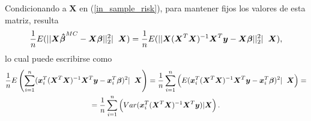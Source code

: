 \documentclass[a4paper,12pt]{report}
\begin{document}
Condicionando a $\boldsymbol{X}$ en (\ref{in_sample_risk}), para mantener fijos los valores de esta matriz, resulta
\begin{gather}
\label{eq: in_sample_risk a}
\frac{1}{n}E(||\boldsymbol{X}\boldsymbol{\hat{\beta}}^{MC}-\boldsymbol{X}\boldsymbol{\beta}||_2^2| \hspace{0.2cm} \boldsymbol{X}) =  
\frac{1}{n}E(||\boldsymbol{X}(\boldsymbol{X}^T\boldsymbol{X})^{-1}\boldsymbol{X}^T\boldsymbol{y}-\boldsymbol{X}\boldsymbol{\beta}||_2^2| \hspace{0.2cm} \boldsymbol{X}),
\end{gather}
lo cual puede escribirse como
\begin{gather}
\nonumber
\frac{1}{n}E\left(\sum_{i=1}^n(\boldsymbol{x}_i^T(\boldsymbol{X}^T\boldsymbol{X})^{-1}\boldsymbol{X}^T\boldsymbol{y}-\boldsymbol{x}_i^T \boldsymbol{\beta})^2| \hspace{0.2cm} \boldsymbol{X}\right) =
\frac{1}{n}\sum_{i=1}^n\left(E(\boldsymbol{x}_i^T(\boldsymbol{X}^T\boldsymbol{X})^{-1}\boldsymbol{X}^T\boldsymbol{y}-\boldsymbol{x}_i^T \boldsymbol{\beta})^2| \hspace{0.2cm} \boldsymbol{X}\right) = \\
\label{error_dentro_result_inter}
=\frac{1}{n}\sum_{i=1}^n\left(Var(\boldsymbol{x}_i^T(\boldsymbol{X}^T\boldsymbol{X})^{-1}\boldsymbol{X}^T\boldsymbol{y})|\boldsymbol{X}\right).
\end{gather}
\end{document}
